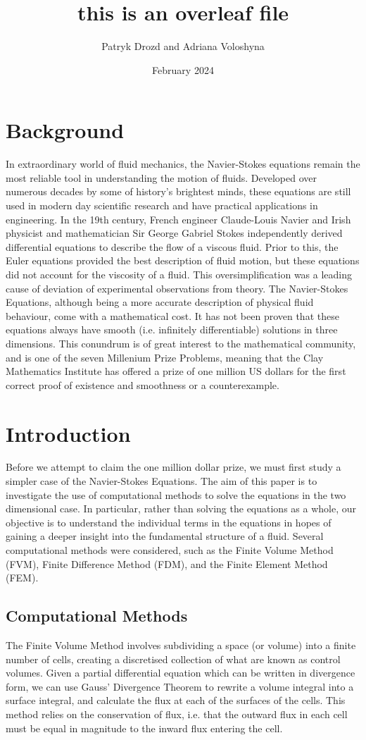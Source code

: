 \documentclass{article}
\title{this is an overleaf file}
\author{Patryk Drozd and Adriana Voloshyna }
\date{February 2024}
\begin{document}
\maketitle

\section{Background}
In extraordinary world of fluid mechanics, the Navier-Stokes equations remain the most reliable tool in understanding the motion of fluids. Developed over numerous decades by some of history's brightest minds, these equations are still used in modern day scientific research and have practical applications in engineering. In the 19th century, French engineer Claude-Louis Navier and  Irish physicist and mathematician Sir George Gabriel Stokes independently derived differential equations to describe the flow of a viscous fluid. Prior to this, the Euler equations provided the best description of fluid motion, but these equations did not account for the viscosity of a fluid. This oversimplification was a leading cause of deviation of experimental observations from theory. The Navier-Stokes Equations, although being a more accurate description of physical fluid behaviour, come with a mathematical cost. It has not been proven that these equations always have smooth (i.e. infinitely differentiable) solutions in three dimensions. This conundrum is of great interest to the mathematical community, and is one of the seven Millenium Prize Problems, meaning that the Clay Mathematics Institute has offered a prize of one million US dollars for the first correct proof of existence and smoothness or a counterexample. 

\section{Introduction}
Before we attempt to claim the one million dollar prize, we must first study a simpler case of the Navier-Stokes Equations. The aim of this paper is to investigate the use of computational methods to solve the equations in the two dimensional case. In particular, rather than solving the equations as a whole, our objective is to understand the individual terms in the equations in hopes of gaining a deeper insight into the fundamental structure of a fluid. Several computational methods were considered, such as the Finite Volume Method (FVM), Finite Difference Method (FDM), and the Finite Element Method (FEM).
\subsection{Computational Methods}
The Finite Volume Method involves subdividing a space (or volume) into a finite number of cells, creating a discretised collection of what are known as control volumes. Given a partial differential equation which can be written in divergence form, we can use Gauss' Divergence Theorem to rewrite a volume integral into a surface integral, and calculate the flux at each of the surfaces of the cells. This method relies on the conservation of flux, i.e. that the outward flux in each cell must be equal in magnitude to the inward flux entering the cell.
\end{document}
